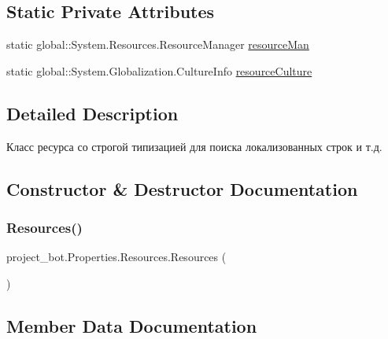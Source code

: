\subsection*{Static Private Attributes}
\begin{DoxyCompactItemize}
\item 
static global\+::\+System.\+Resources.\+Resource\+Manager \hyperlink{classproject__bot_1_1_properties_1_1_resources_a030625292ee89661f655f8c277732c01}{resource\+Man}
\item 
static global\+::\+System.\+Globalization.\+Culture\+Info \hyperlink{classproject__bot_1_1_properties_1_1_resources_adb7ba304d2371ab1bda72552c6e0c4ca}{resource\+Culture}
\end{DoxyCompactItemize}


\subsection{Detailed Description}
Класс ресурса со строгой типизацией для поиска локализованных строк и т.\+д. 



\subsection{Constructor \& Destructor Documentation}
\mbox{\label{classproject__bot_1_1_properties_1_1_resources_a89706512e3081d1777e26ecd9b57bdf5}} 
\subsubsection{\texorpdfstring{Resources()}{Resources()}}
{\footnotesize\ttfamily project\+\_\+bot.\+Properties.\+Resources.\+Resources (\begin{DoxyParamCaption}{ }\end{DoxyParamCaption})\hspace{0.3cm}{\ttfamily [package]}}



\subsection{Member Data Documentation}
\mbox{\label{classproject__bot_1_1_properties_1_1_resources_adb7ba304d2371ab1bda72552c6e0c4ca}} 
